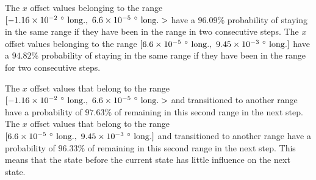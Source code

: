 \documentclass[preprint,12pt]{elsarticle}
\begin{document}
The $x$ offset values belonging to the range $[-1.16 \times 10^{-2} \ \degree \ \mathrm{long.}, \ 6.6 \times 10^{-5} \ \degree \ \mathrm{long.}>$ have a $96.09\%$ probability of staying in the same range if they have been in the range in two consecutive steps. The $x$ offset values belonging to the range $[6.6 \times 10^{-5} \ \degree \ \mathrm{long.}, \ 9.45 \times 10^{-3} \ \degree \ \mathrm{long.}]$ have a $94.82\%$ probability of staying in the same range if they have been in the range for two consecutive steps.

The $x$ offset values that belong to the range $[-1.16 \times 10^{-2} \ \degree \ \mathrm{long.}, \ 6.6 \times 10^{-5} \ \degree \ \mathrm{long.}>$ and transitioned to another range have a probability of $97.63\%$ of remaining in this second range in the next step. The $x$ offset values that belong to the range $[6.6 \times 10^{-5} \ \degree \ \mathrm{long.}, \ 9.45 \times 10^{-3} \ \degree \ \mathrm{long.}]$ and transitioned to another range have a probability of $96.33\%$ of remaining in this second range in the next step. This means that the state before the current state has little influence on the next state.
\end{document}
